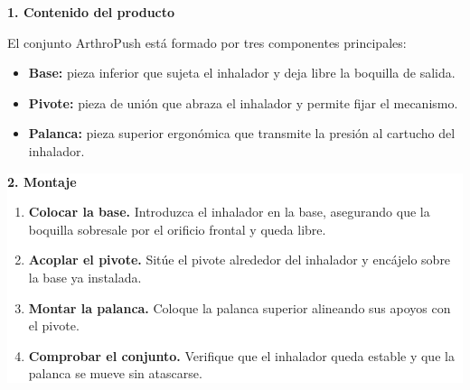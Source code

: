 \documentclass[11pt,a4paper]{article}
\begin{document}
\noindent
\begin{minipage}{\textwidth}
\setlength{\fboxsep}{10pt}
\colorbox{ArthroTeal!8}{
\begin{minipage}{0.96\textwidth}

{\large\bfseries\color{ArthroNavy} 1. Contenido del producto}

\vspace{0.2cm}

El conjunto ArthroPush está formado por tres componentes principales:

\begin{itemize}
    \item \textbf{Base:} pieza inferior que sujeta el inhalador y deja libre la boquilla de salida.
    \item \textbf{Pivote:} pieza de unión que abraza el inhalador y permite fijar el mecanismo.
    \item \textbf{Palanca:} pieza superior ergonómica que transmite la presión al cartucho del inhalador.
\end{itemize}

\end{minipage}
}
\end{minipage}

\vspace{0.4cm}

\noindent
\begin{minipage}{\textwidth}
\setlength{\fboxsep}{10pt}
\colorbox{white}{
\begin{minipage}{0.96\textwidth}

{\large\bfseries\color{ArthroNavy} 2. Montaje}

\vspace{0.2cm}

\begin{enumerate}
    \item \textbf{Colocar la base.} Introduzca el inhalador en la base, asegurando que la boquilla sobresale por el orificio frontal y queda libre.
    \item \textbf{Acoplar el pivote.} Sitúe el pivote alrededor del inhalador y encájelo sobre la base ya instalada.
    \item \textbf{Montar la palanca.} Coloque la palanca superior alineando sus apoyos con el pivote.
    \item \textbf{Comprobar el conjunto.} Verifique que el inhalador queda estable y que la palanca se mueve sin atascarse.
\end{enumerate}

\end{minipage}
}
\end{minipage}
\end{document}
